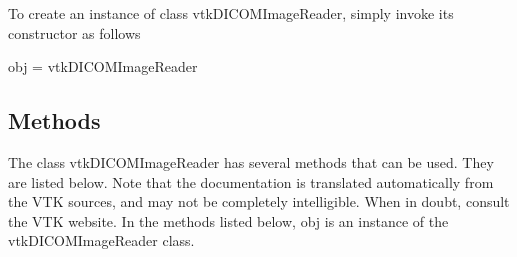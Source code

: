 To create an instance of class vtk\-D\-I\-C\-O\-M\-Image\-Reader, simply invoke its constructor as follows \begin{DoxyVerb}  obj = vtkDICOMImageReader
\end{DoxyVerb}
 \hypertarget{vtkwidgets_vtkxyplotwidget_Methods}{}\subsection{Methods}\label{vtkwidgets_vtkxyplotwidget_Methods}
The class vtk\-D\-I\-C\-O\-M\-Image\-Reader has several methods that can be used. They are listed below. Note that the documentation is translated automatically from the V\-T\-K sources, and may not be completely intelligible. When in doubt, consult the V\-T\-K website. In the methods listed below, {\ttfamily obj} is an instance of the vtk\-D\-I\-C\-O\-M\-Image\-Reader class. 
